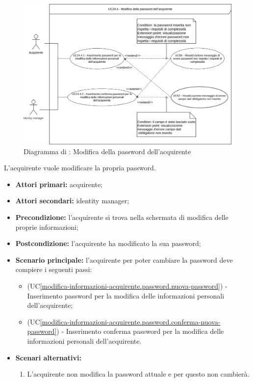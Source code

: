 \label{modifica-informazioni-acquirente.password}

\begin{figure}[H]
    \centering
    \includegraphics[scale=0.6]{Immagini/DiagrammiUC/ModificaPasswordAcquirente.png}
    \caption{Diagramma di \actualUC: Modifica della password dell'acquirente}
    \label{fig:modifica-informazioni-acquirente.password}
\end{figure}

L'acquirente vuole modificare la propria password.
\begin{itemize}
    \item \textbf{Attori primari:} acquirente;
    \item \textbf{Attori secondari:} identity manager;
    \item \textbf{Precondizione:} l'acquirente si trova nella schermata di modifica delle proprie informazioni;
    \item \textbf{Postcondizione:} l'acquirente ha modificato la sua password;
    \item \textbf{Scenario principale:} l'acquirente per poter cambiare la password deve compiere i seguenti passi:
    \begin{itemize}
        \item (UC\ref{modifica-informazioni-acquirente.password.nuova-password}) - Inserimento password per la modifica delle informazioni personali dell'acquirente;
        \item (UC\ref{modifica-informazioni-acquirente.password.conferma-nuova-password}) - Inserimento conferma password per la modifica delle informazioni personali dell'acquirente.
    \end{itemize}
    \item \textbf{Scenari alternativi:}
    \begin{enumerate}[label=\lett]
        \item L'acquirente non modifica la password attuale e per questo non cambierà. 
    \end{enumerate}
\end{itemize}

